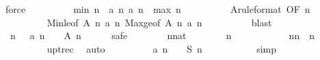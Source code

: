 \begin{isabellebody}
\ force\isanewline
\ \ \ \ \ \ \isamarkupfalse%
\ \isamarkupfalse%
\ {\isachardoublequoteopen}{\isacharquery}min\ n\ {\isasymle}\ a\ n{\isachardoublequoteclose}\ {\isachardoublequoteopen}a\ n\ {\isasymle}\ {\isacharquery}max\ n{\isachardoublequoteclose}\isanewline
\ \ \ \ \ \ \ \ \isamarkupfalse%
\ A{\isacharbrackleft}rule{\isacharunderscore}format{\isacharcomma}\ OF\ {\isacharbackquoteopen}n\ {\isasymge}\ {}{\isacharbackquoteclose}{\isacharbrackright}\ \isanewline
\ \ \ \ \ \ \ \ \isamarkupfalse%
\ Min{\isacharunderscore}le{\isacharbrackleft}of\ {\isachardoublequoteopen}{\isacharquery}A\ n{\isachardoublequoteclose}\ {\isachardoublequoteopen}a\ n{\isachardoublequoteclose}{\isacharbrackright}\ Max{\isacharunderscore}ge{\isacharbrackleft}of\ {\isachardoublequoteopen}{\isacharquery}A\ n{\isachardoublequoteclose}\ {\isachardoublequoteopen}a\ n{\isachardoublequoteclose}{\isacharbrackright}\isanewline
\ \ \ \ \ \ \ \ \isamarkupfalse%
\ blast{\isacharplus}\isanewline
\ \ \ \ \isamarkupfalse%
\isanewline
\isanewline
\ \ \ \ \isamarkupfalse%
\ {\isachardoublequoteopen}{\isasymforall}\ n\ {\isasymge}\ {}{\isachardot}\ a\ {\isacharparenleft}n\ {\isacharminus}\ {}{\isacharparenright}\ {\isasymin}\ {\isacharquery}A\ n{\isachardoublequoteclose}\isanewline
\ \ \ \ \isamarkupfalse%
\ safe\isanewline
\ \ \ \ \ \ \isamarkupfalse%
\ n{\isacharcolon}{\isacharcolon}nat\isanewline
\ \ \ \ \ \ \isamarkupfalse%
\ {\isachardoublequoteopen}n\ {\isasymge}\ {}{\isachardoublequoteclose}\isanewline
\ \ \ \ \ \ \isamarkupfalse%
\ \isamarkupfalse%
\ {\isachardoublequoteopen}{\isacharbrackleft}n{\isacharminus}{}{\isachardot}{\isachardot}{\isacharless}n{\isacharbrackright}\ {\isacharequal}\ {\isacharbrackleft}n{\isacharminus}{}{\isacharbrackright}{\isachardoublequoteclose}\isanewline
\ \ \ \ \ \ \ \ \isamarkupfalse%
\ upt{\isacharunderscore}rec\ \isamarkupfalse%
\ auto\isanewline
\ \ \ \ \ \ \isamarkupfalse%
\ \isamarkupfalse%
\ {\isachardoublequoteopen}a\ {\isacharparenleft}n\ {\isacharminus}\ {}{\isacharparenright}\ {\isacharequal}\ {\isacharquery}S\ n\ {}{\isachardoublequoteclose}\isanewline
\ \ \ \ \ \ \ \ \isamarkupfalse%
\ simp\isanewline
\ \ \ \ \ \ \isamarkupfalse%
\ \isamarkupfalse%

\end{isabellebody}
